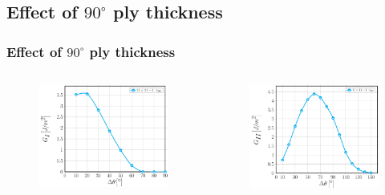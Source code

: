 \documentclass[first,firstsupp,lastsupp,last,hyperref,table]{ETHclass}
\begin{document}
\subsection{Effect of $90^{\circ}$ ply thickness}

\begin{frame}
\frametitle{\vspace{0.2cm}\small Effect of $90^{\circ}$ ply thickness}
\vspace{-.75cm}
\centering
\begin{columns}[c]
\centering
\begin{column}{0.5\textwidth}
\centering
\begin{figure}
\centering
\includegraphics[width=\columnwidth]{nxk-1-vf60-GI-thick.pdf}
\end{figure}
\end{column}
\begin{column}{0.5\textwidth}
\centering
\begin{figure}
\centering
\includegraphics[width=\columnwidth]{nxk-1-vf60-GII-thick.pdf}

\end{figure}
\end{column}
\end{columns}
\end{frame}
\end{document}
